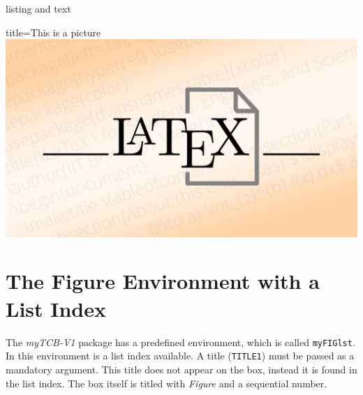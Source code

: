 \documentclass[]{myHOWTO-V001}
\begin{document}
\begin{myTEXEXdoclst}{}{listing and text}
\setlength{\parskip}{3mm}

\lipsum[4]

\qquad
\begin{myFIG}{title={This is a picture}}
	\includegraphics[scale=0.15]{LaTeX.jpg}
\end{myFIG}

\lipsum[2]
\end{myTEXEXdoclst}

%
%

\section{The Figure Environment with a List Index}

The \emph{myTCB-V1} package has a predefined environment, which is called \Verb|myFIGlst|. In this environment is a list index available. A title (\verb|TITLE1|) must be passed as a mandatory argument. This title does not appear on the box, instead it is found in the list index. The box itself is titled with \emph{Figure} and a sequential number.
\end{document}
